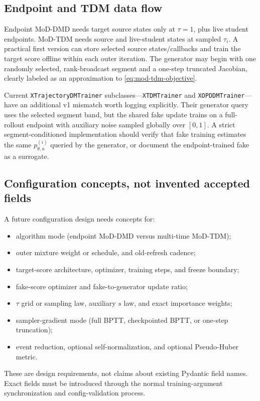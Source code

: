 \documentclass[11pt,a4paper]{article}
\theoremstyle{plain}
\theoremstyle{definition}
\begin{document}
\subsection{Endpoint and TDM data flow}

Endpoint MoD-DMD needs target source states only at $\tau=1$, plus live student endpoints.
MoD-TDM needs source and live-student states at sampled $\tau_i$.  A practical first version can
store selected source states/callbacks and train the target score offline within each outer
iteration.  The generator may begin with one randomly selected, rank-broadcast segment and a
one-step truncated Jacobian, clearly labeled as an approximation to
\eqref{eq:mod-tdm-objective}.

Current \texttt{XTrajectoryDMTrainer} subclasses---\texttt{XTDMTrainer} and
\texttt{XOPDDMTrainer}---have an additional v1 mismatch worth logging explicitly.  Their
generator query uses the selected segment band, but the shared fake update trains on a
full-rollout endpoint with auxiliary noise sampled globally over $[0,1]$.  A strict
segment-conditioned implementation should verify that fake training estimates the same
$p_{\theta,u}^{(i)}$ queried by the generator, or document the endpoint-trained fake as a
surrogate.

\subsection{Configuration concepts, not invented accepted fields}

A future configuration design needs concepts for:
\begin{itemize}[leftmargin=1.5em]
\item algorithm mode (endpoint MoD-DMD versus multi-time MoD-TDM);
\item outer mixture weight or schedule, and old-refresh cadence;
\item target-score architecture, optimizer, training steps, and freeze boundary;
\item fake-score optimizer and fake-to-generator update ratio;
\item $\tau$ grid or sampling law, auxiliary $s$ law, and exact importance weights;
\item sampler-gradient mode (full BPTT, checkpointed BPTT, or one-step truncation);
\item event reduction, optional self-normalization, and optional Pseudo-Huber metric.
\end{itemize}
These are design requirements, not claims about existing Pydantic field names.  Exact fields
must be introduced through the normal training-argument synchronization and config-validation
process.
\end{document}
